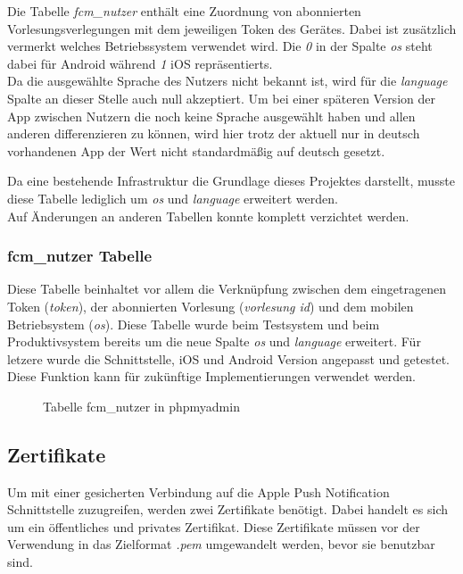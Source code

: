 Die Tabelle \textit{fcm\_nutzer} enthält eine Zuordnung von abonnierten Vorlesungsverlegungen mit dem jeweiligen Token des Gerätes. Dabei ist zusätzlich vermerkt welches Betriebssystem verwendet wird. Die \textit{0} in der Spalte \textit{os} steht dabei für Android während \textit{1} iOS repräsentierts. \\
Da die ausgewählte Sprache des Nutzers nicht bekannt ist, wird für die \textit{language} Spalte an dieser Stelle auch null akzeptiert. Um bei einer späteren Version der App zwischen Nutzern die noch keine Sprache ausgewählt haben und allen anderen differenzieren zu können, wird hier trotz der aktuell nur in deutsch vorhandenen App der Wert nicht standardmäßig auf deutsch gesetzt.

Da eine bestehende Infrastruktur die Grundlage dieses Projektes darstellt, musste diese Tabelle lediglich um \textit{os} und \textit{language} erweitert werden.\\
Auf Änderungen an anderen Tabellen konnte komplett verzichtet werden.


\subsubsection{fcm\_nutzer Tabelle}
Diese Tabelle beinhaltet vor allem die Verknüpfung zwischen dem eingetragenen Token (\textit{token}), der abonnierten Vorlesung (\textit{vorlesung id}) und dem mobilen Betriebsystem (\textit{os}). Diese Tabelle wurde beim Testsystem und beim Produktivsystem bereits um die neue Spalte \textit{os} und \textit{language} erweitert. Für letzere wurde die Schnittstelle, iOS und Android Version angepasst und getestet. Diese Funktion kann für zukünftige Implementierungen verwendet werden.
\begin{figure}[H]
	\centering
	\caption{Tabelle fcm\_nutzer in phpmyadmin}
	\label{datenbank_nutzer}
\end{figure}

\textcolor{black}{

}

\subsection{Zertifikate}
Um mit einer gesicherten Verbindung auf die Apple Push Notification Schnittstelle zuzugreifen, werden zwei Zertifikate benötigt. Dabei handelt es sich um ein öffentliches und privates Zertifikat. Diese Zertifikate müssen vor der Verwendung in das Zielformat \textit{.pem} umgewandelt werden, bevor sie benutzbar sind.

